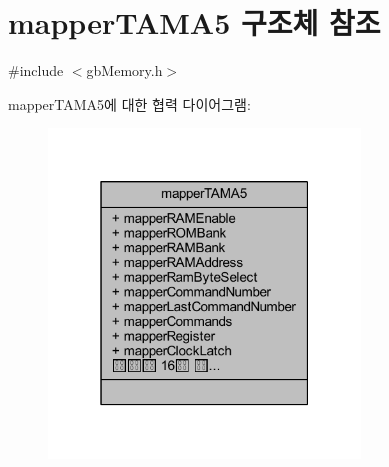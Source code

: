 \hypertarget{structmapper_t_a_m_a5}{}\section{mapper\+T\+A\+M\+A5 구조체 참조}
\label{structmapper_t_a_m_a5}


{\ttfamily \#include $<$gb\+Memory.\+h$>$}



mapper\+T\+A\+M\+A5에 대한 협력 다이어그램\+:\nopagebreak
\begin{figure}[H]
\begin{center}
\leavevmode
\includegraphics[width=235pt]{structmapper_t_a_m_a5__coll__graph}
\end{center}
\end{figure}
